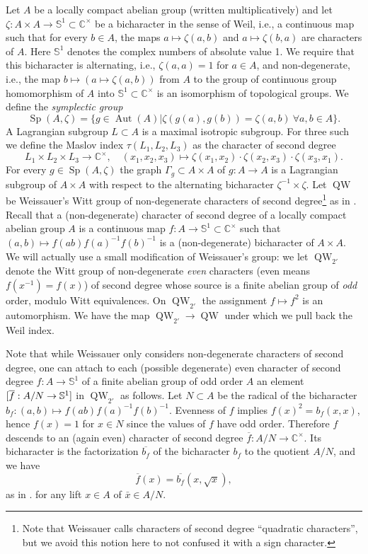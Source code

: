 \documentclass{article}
\def\mb#1{\mathbb{#1}}
\def\C{\mathbb{C}}
\def\ol#1{\overline{#1}}
\newcommand{\bC}{\mathbb{C}}
\DeclareMathOperator{\Sp}{Sp}
\theoremstyle{definition}
\numberwithin{equation}{subsection}
\renewcommand{\-}{\hyp{}}
\DeclareMathOperator{\QW}{QW}
\DeclareMathOperator{\Aut}{Aut}
\begin{document}
\begin{appendices}
Let $A$ be a locally compact abelian group (written multiplicatively) and let $\zeta : A \times A \to \mb{S}^1 \subset \C^\times$ be a bicharacter in the sense of Weil, i.e., a continuous map such that for every $b \in A$, the maps $a \mapsto \zeta(a, b)$ and $a \mapsto \zeta(b, a)$ are characters of $A$. Here $\mb{S}^1$ denotes the complex numbers of absolute value 1. We require that this bicharacter is alternating, i.e., $\zeta(a,a)=1$ for $a \in A$, and non-degenerate, i.e., the map $b \mapsto (a \mapsto \zeta(a,b))$ from $A$ to the group of continuous group homomorphism of $A$ into $\mb{S}^1 \subset \bC^\times$ is an isomorphism of topological groups. We define the \emph{symplectic group} 
\[ \Sp(A,\zeta)=\{g \in \Aut(A)|\zeta(g(a),g(b))=\zeta(a,b)\ \forall a,b \in A\}. \] 
A Lagrangian subgroup $L \subset A$ is a maximal isotropic subgroup. For three such we define the Maslov index $\tau(L_1,L_2,L_3)$ as the character of second degree
\[ L_1 \times L_2 \times L_3 \to \C^\times,\quad (x_1,x_2,x_3) \mapsto \zeta(x_1,x_2) \cdot \zeta(x_2,x_3)  \cdot \zeta(x_3,x_1). \]
For every $g \in \Sp(A,\zeta)$ the graph $\Gamma_g \subset A \times A$ of $g : A \to A$ is a Lagrangian subgroup of $A \times A$ with respect to the alternating bicharacter $\zeta^{-1} \times \zeta$. Let $\QW$ be Weissauer's  Witt group of non-degenerate characters of second degree\footnote{Note that Weissauer calls characters of second degree ``quadratic characters'', but we avoid this notion here to not confused it with a sign character.} as in \cite{Weissauer1986}. Recall that a (non-degenerate) character of second degree of a locally compact abelian group $A$ is a continuous map $f:A \to \mb{S}^1 \subset \bC^\times$ such that $(a,b)\mapsto f(ab)f(a)^{-1}f(b)^{-1}$ is a (non-degenerate) bicharacter of $A \times A$. We will actually use a small modification of Weissauer's group: we let $\QW_{2'}$ denote the Witt group of non-degenerate \emph{even} characters (even means $f(x^{-1})=f(x)$) of second degree whose source is a finite abelian group of \emph{odd} order, modulo Witt equivalences. On $\QW_{2'}$ the assignment $f \mapsto f^2$ is an automorphism. We have the map $\QW_{2'} \to \QW$ under which we pull back the Weil index.

Note that while Weissauer only considers non-degenerate characters of second degree, one can attach to each (possible degenerate) even character of second degree  $f: A \to \mb{S}^1$ of a finite abelian group of odd order $A$ an element $[\ol{f} : A/N \ra \mb{S}^1]$ in $\QW_{2'}$ as follows. Let $N \subset A$ be the radical of the bicharacter $b_f: (a,b)\mapsto f(ab)f(a)^{-1}f(b)^{-1}$. Evenness of $f$ implies $f(x)^2=b_f(x,x)$, hence $f(x)=1$ for $x \in N$ since the values of $f$ have odd order. Therefore $f$ descends to an (again even) character of second degree $\ol{f} : A/N \to \C^\times$. Its bicharacter is the factorization $\overline{b_f}$ of the bicharacter $b_f$ to the quotient $A/N$, and we have
\[ \ol{f}(x) = \overline{b_f}(x, \sqrt{x}), \]
 as in \cite[\S3, page 79]{Weissauer1986}.
for any lift $x \in A$ of $\bar x \in A/N$. 


\end{appendices}
\end{document}

